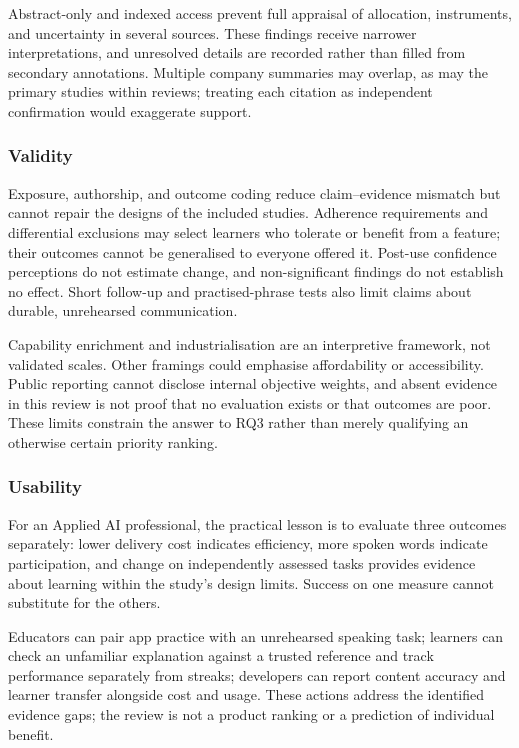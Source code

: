 \documentclass[11pt,titlepage]{article}
\begin{document}
Abstract-only and indexed access prevent full appraisal of allocation, instruments, and uncertainty in several sources. These findings receive narrower interpretations, and unresolved details are recorded rather than filled from secondary annotations. Multiple company summaries may overlap, as may the primary studies within reviews; treating each citation as independent confirmation would exaggerate support.

\subsubsection{Validity}
Exposure, authorship, and outcome coding reduce claim--evidence mismatch but cannot repair the designs of the included studies. Adherence requirements and differential exclusions may select learners who tolerate or benefit from a feature; their outcomes cannot be generalised to everyone offered it. Post-use confidence perceptions do not estimate change, and non-significant findings do not establish no effect. Short follow-up and practised-phrase tests also limit claims about durable, unrehearsed communication.

Capability enrichment and industrialisation are an interpretive framework, not validated scales. Other framings could emphasise affordability or accessibility. Public reporting cannot disclose internal objective weights, and absent evidence in this review is not proof that no evaluation exists or that outcomes are poor. These limits constrain the answer to RQ3 rather than merely qualifying an otherwise certain priority ranking.

\subsubsection{Usability}
For an Applied AI professional, the practical lesson is to evaluate three outcomes separately: lower delivery cost indicates efficiency, more spoken words indicate participation, and change on independently assessed tasks provides evidence about learning within the study's design limits. Success on one measure cannot substitute for the others.

Educators can pair app practice with an unrehearsed speaking task; learners can check an unfamiliar explanation against a trusted reference and track performance separately from streaks; developers can report content accuracy and learner transfer alongside cost and usage. These actions address the identified evidence gaps; the review is not a product ranking or a prediction of individual benefit.
\end{document}
